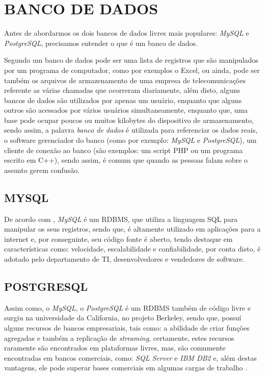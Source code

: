 \chapter{BANCO DE DADOS}
\label{bancoDeDados}

Antes de abordarmos os dois bancos de dados livres mais populares:
\textit{MySQL} e \textit{PostgreSQL}, precisamos entender o que é um banco de
dados.

Segundo  um banco de dados pode ser uma
lista de registros que são manipulados por um programa de computador, como por exemplos o Excel, ou ainda,
pode ser também os arquivos de armazenamento de uma empresa de telecomunicações 
referente as várias chamadas que ocorreram diariamente, além disto, alguns
bancos de dados são utilizados por apenas um usuário, enquanto que alguns outros são 
acessados por vários usuários simultaneamente, enquanto que, uma base pode
ocupar poucos ou muitos kilobytes do dispositivo de armazenamento, sendo
assim, a palavra \textit{banco de dados} é utilizada para referenciar os
dados reais, o software gerenciador do banco (como por exemplo: \textit{MySQL} 
e \textit{PostgreSQL}), um cliente de conexão ao banco (são exemplos:  um script
PHP ou um programa escrito em C++), sendo assim, é comum que quando as  pessoas
falam sobre o assunto gerem confusão.

\section{MYSQL}

De acordo com , \textit{MySQL} é um
\ac{RDBMS},  que utiliza a linguagem \ac{SQL} para manipular os seus registros, 
sendo que, é altamente utilizado em aplicações para a internet e, por
conseguinte,  seu código fonte é aberto, tendo destaque em características
como: velocidade, escalabilidade e confiabilidade, por conta disto, é adotado
pelo departamento de \ac{TI}, desenvolvedores e vendedores de software.

\section{POSTGRESQL}

Assim como, o \textit{MySQL}, o \textit{PostgreSQL} é um \acs{RDBMS} também de código
livre e surgiu na universidade da California, no projeto Berkeley, sendo que,
possuí alguns recursos de bancos empresariais, tais como: a abilidade de criar
funções agregadas e também a replicação de \textit{streaming}, certamente, estes
recursos raramente são encontrados em plataformas livres, mas, são comumente
encontradas em bancos comerciais, como: \textit{SQL Server} e \textit{IBM DB2}
e, além destas vantagens, ele pode superar bases comerciais em algumas cargas de
trabalho \cite{postgreSQLUpAndRunning}.

